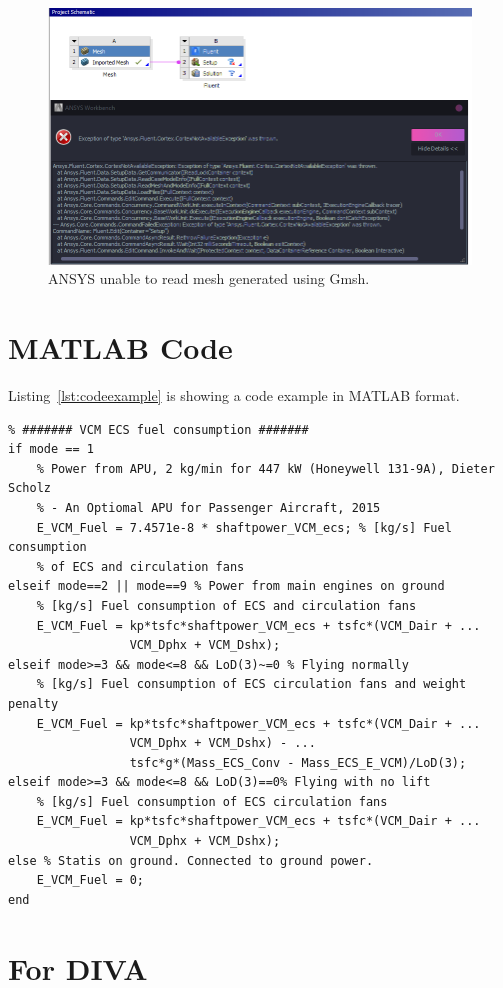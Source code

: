 \documentclass[english]{kththesis}
\begin{document}
\begin{figure}[!htb]
    \centering
    \includegraphics[width=1\textwidth]{IPS/cant read gmsh mesh.png}
    \caption{ANSYS unable to read mesh generated using Gmsh.}
    \label{fig:ansys_error_gmsh}
\end{figure}


\clearpage
\section{MATLAB Code}
\label{sec:AppMatlab}

Listing~\ref{lst:codeexample} is showing a code example in MATLAB format.

\begin{lstlisting}[caption={Fuel calculations.}, label=lst:codeexample]
% Testing to include MATLAB code in LaTeX
% ####### VCM ECS fuel consumption #######
if mode == 1
    % Power from APU, 2 kg/min for 447 kW (Honeywell 131-9A), Dieter Scholz
    % - An Optiomal APU for Passenger Aircraft, 2015
    E_VCM_Fuel = 7.4571e-8 * shaftpower_VCM_ecs; % [kg/s] Fuel consumption
    % of ECS and circulation fans
elseif mode==2 || mode==9 % Power from main engines on ground
    % [kg/s] Fuel consumption of ECS and circulation fans
    E_VCM_Fuel = kp*tsfc*shaftpower_VCM_ecs + tsfc*(VCM_Dair + ...
                 VCM_Dphx + VCM_Dshx); 
elseif mode>=3 && mode<=8 && LoD(3)~=0 % Flying normally
    % [kg/s] Fuel consumption of ECS circulation fans and weight penalty
    E_VCM_Fuel = kp*tsfc*shaftpower_VCM_ecs + tsfc*(VCM_Dair + ...
                 VCM_Dphx + VCM_Dshx) - ...
                 tsfc*g*(Mass_ECS_Conv - Mass_ECS_E_VCM)/LoD(3);
elseif mode>=3 && mode<=8 && LoD(3)==0% Flying with no lift
    % [kg/s] Fuel consumption of ECS circulation fans
    E_VCM_Fuel = kp*tsfc*shaftpower_VCM_ecs + tsfc*(VCM_Dair + ... 
                 VCM_Dphx + VCM_Dshx); 
else % Statis on ground. Connected to ground power.
    E_VCM_Fuel = 0;
end
\end{lstlisting}



\label{pg:lastPageofMainmatter}


\clearpage
\section*{For DIVA}
\end{document}
